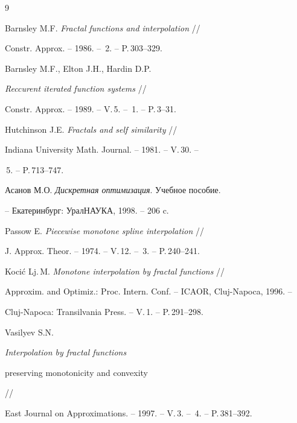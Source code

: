 \begin{thebibliography}{9}







Barnsley M.F. {\it Fractal functions and interpolation } //


Constr. Approx. -- 1986. -- \No\,2. -- P.\,303--329.




Barnsley M.F., Elton J.H., Hardin D.P.


{\it Reccurent iterated function systems} //


Constr. Approx. -- 1989. -- V.\,5. -- \No\,1. -- P.\,3--31.




Hutchinson J.E. {\it Fractals and self similarity} //


Indiana University Math. Journal. -- 1981. -- V.\,30. --


\No\,5. -- P.\,713--747.




Асанов М.О. {\it Дискретная оптимизация}. Учебное пособие.


-- Екатеринбург: УралНАУКА, 1998. -- 206 c.




Passow E. {\it Piecewise monotone spline interpolation} //


J. Approx. Theor. -- 1974. -- V.\,12. -- \No\,3. -- P.\,240--241.




Koci\'c Lj.\,M. {\it Monotone interpolation by fractal functions} //


Approxim. and Optimiz.: Proc. Intern. Conf. -- ICAOR, Cluj-Napoca, 1996. --


Cluj-Napoca: Transilvania Press. -- V.\,1. -- P.\,291--298.




Vasilyev S.N. {\it Interpolation by fractal functions


preserving monotonicity and convexity} //


East Journal on Approximations. -- 1997. -- V.\,3. -- \No\,4. -- P.\,381--392.





\end{thebibliography}





\vskip 2cm














\label{end}





